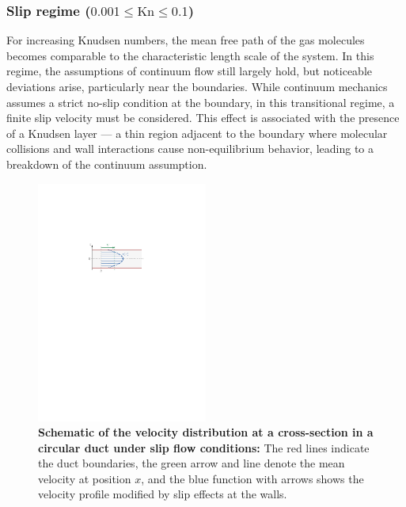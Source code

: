 \subsubsection*{Slip regime ($0.001 \leq \mathrm{Kn} \leq 0.1$)}
	For increasing Knudsen numbers, the mean free path of the gas molecules becomes comparable to the characteristic length scale of the system.
	In this regime, the assumptions of continuum flow still largely hold, but noticeable deviations arise, particularly near the boundaries.
	While continuum mechanics assumes a strict no-slip condition at the boundary, in this transitional regime, a finite slip velocity must be considered.
	This effect is associated with the presence of a Knudsen layer — a thin region adjacent to the boundary where molecular collisions and wall interactions cause non-equilibrium behavior, leading to a breakdown of the continuum assumption.
	\begin{figure}[H]
	    \centering
	    \includegraphics[width=0.5\textwidth]{src/02_foundations/fig_slip-regime.pdf}
		\caption[Schematic of the velocity distribution at a cross-section in a circular duct under slip flow conditions.]{
			\textbf{Schematic of the velocity distribution at a cross-section in a circular duct under slip flow conditions:}
			The red lines indicate the duct boundaries, the green arrow and line denote the mean velocity at position $x$, and the blue function with arrows shows the velocity profile modified by slip effects at the walls. \cite{Cengel2017}
		}
		\label{fig:slip-flow}
	\end{figure}

